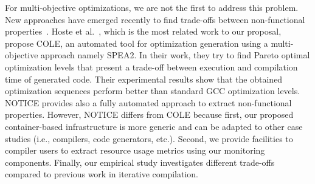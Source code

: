 For multi-objective optimizations, we are not the first to address this problem. New approaches have emerged recently to find trade-offs between non-functional properties~\cite{hoste2008cole,martinez2014multi,lokuciejewski2010multi}. Hoste et al.~\cite{hoste2008cole}, which is the most related work to our proposal, propose COLE, an automated tool for optimization generation using a multi-objective approach namely SPEA2. In their work, they try to find Pareto optimal optimization levels that present a trade-off between execution and compilation time of generated code. Their experimental results show that the obtained optimization sequences perform better than standard GCC optimization levels. NOTICE provides also a fully automated approach to extract non-functional properties. However, NOTICE differs from COLE because first, our proposed container-based infrastructure is more generic and can be adapted to other case studies (i.e., compilers, code generators, etc.). Second, we provide facilities to compiler users to extract resource usage metrics using our monitoring components. Finally, our empirical study investigates different trade-offs compared to previous work in iterative compilation.




